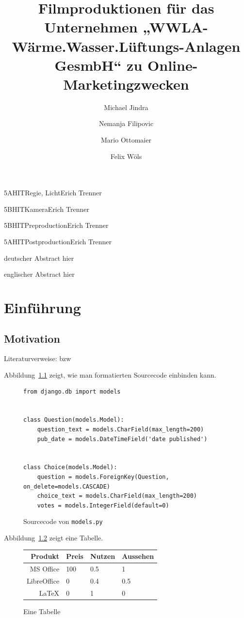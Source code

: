 \documentclass[medt,2017]{hitda}
\title{Filmproduktionen für das Unternehmen „WWLA-Wärme.Wasser.Lüftungs-Anlagen GesmbH“ zu Online-Marketingzwecken}
\begin{document}
\begin{titlepage}
\author{Michael Jindra}{5AHIT}{Regie, Licht}{Erich Trenner}
\author{Nemanja Filipovic}{5BHIT}{Kamera}{Erich Trenner}
\author{Mario Ottomaier}{5BHIT}{Preproduction}{Erich Trenner}
\author{Felix W\"ols}{5AHIT}{Postproduction}{Erich Trenner}
\end{titlepage}

\declaration

\begin{abstract-de}
deutscher Abstract hier
\end{abstract-de}

\begin{abstract-en}
englischer Abstract hier
\end{abstract-en}

\tableofcontents

\chapter{Einführung}
\begincontent
{}
\section{Motivation}
Literaturverweise: \cite{book} bzw \cite{article, incollection, inbook}

Abbildung~\ref{fig:sourcecode} zeigt, wie man formatierten Sourcecode einbinden kann.
\begin{figure}[h]
\begin{lstlisting}
from django.db import models


class Question(models.Model):
    question_text = models.CharField(max_length=200)
    pub_date = models.DateTimeField('date published')


class Choice(models.Model):
    question = models.ForeignKey(Question, on_delete=models.CASCADE)
    choice_text = models.CharField(max_length=200)
    votes = models.IntegerField(default=0)
\end{lstlisting}
\caption{Sourcecode von \texttt{models.py}}
\label{fig:sourcecode}
\end{figure}

Abbildung~\ref{fig:table} zeigt eine Tabelle.

\begin{figure}\centering
\begin{tabular}{r|lll}
\toprule
Produkt & Preis & Nutzen & Aussehen\\
\midrule
MS Office & 100 & 0.5 & 1\\
LibreOffice & 0 & 0.4 & 0.5 \\
\LaTeX & 0 & 1 & 0 \\
\bottomrule
\end{tabular}
\caption{Eine Tabelle}
\label{fig:table}
\end{figure}
\end{document}
